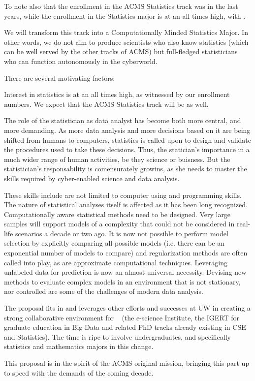 To note also that the enrollment in the ACMS Statistics track was
 in the last years, while the enrollment in the Statistics
major is at an all times high, with .

We will transform this track into a Computationally Minded Statistics
Major. In other words, we do not aim to produce scientists who also
know statistics (which can be well served by the other tracks of ACMS)
but full-fledged statisticians who can function autonomously in the
cyberworld.

 There are several motivating factors:
\bit
\item Interest in statistics is at an all times high, as witnessed by our enrollment numbers. We expect that the ACMS Statistics track will be as well.
\item The role of the statistician as data analyst has become both
  more central, and more demanding. As more data analysis and more
  decisions based on it are being shifted from humans to computers,
  statistics is called upon to design and validate the procedures used
  to take these decisions. Thus, the statician's importance in a much
  wider range of human activities, be they science or buisness. But
  the statistician's responsability is comensurately growins, as she
  needs to master the skills required by cyber-enabled science and
  data analysis. 
\item These skills include are not limited to computer using and
  programming skills. The nature of statistical analyses itself is
  affected  as it has been long
  recognized. Computationally aware statistical methods need to be
  designed. Very large samples will support models of a complexity
  that could not be considered in real-life scenarios a decade or two
  ago. It is now not possible to perform model selection by explicitly
  comparing all possible models (i.e. there can be an exponential
  number of models to compare) and regularization methods are often
  called into play, as are approximate computational
  techniques. Leveraging unlabeled data for prediction is now an
  almost universal necessity. Devising new methods to evaluate complex
  models in an environment that is not stationary, nor controlled are
  some of the challenges of modern data analysis.
\item The proposal fits in and leverages other efforts and successes at UW in creating a strong collaborative environment for \cdse~ (the e-science Institute, the IGERT for graduate education in Big Data and related PhD tracks already existing in CSE and Statistics). The time is ripe to involve undergraduates, and specifically statistics and mathematics majors in this change.
\item This proposal is in the spirit of the ACMS original mission,
  bringing this part up to speed with the demands of the coming decade.
\eit

